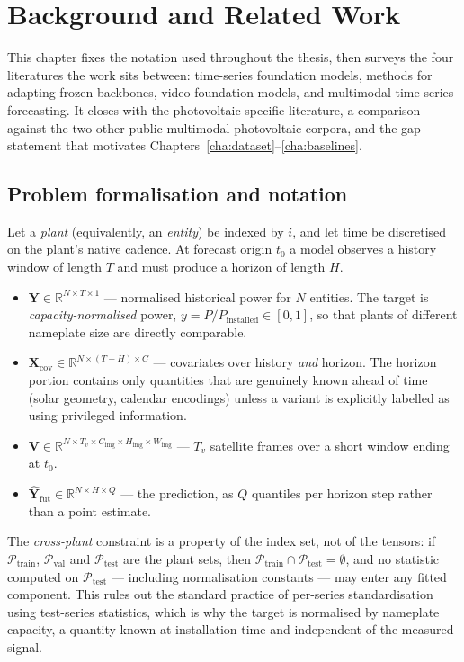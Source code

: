 \chapter{Background and Related Work}
\label{cha:background}

This chapter fixes the notation used throughout the thesis, then surveys the four
literatures the work sits between: time-series foundation models, methods for adapting
frozen backbones, video foundation models, and multimodal time-series forecasting. It
closes with the photovoltaic-specific literature, a comparison against the two other public
multimodal photovoltaic corpora, and the gap statement that motivates
Chapters~\ref{cha:dataset}--\ref{cha:baselines}.

\section{Problem formalisation and notation}
\label{sec:formalisation}

Let a \emph{plant} (equivalently, an \emph{entity}) be indexed by $i$, and let time be
discretised on the plant's native cadence. At forecast origin $t_0$ a model observes a
history window of length $T$ and must produce a horizon of length $H$.

\begin{itemize}
  \item $\mathbf{Y} \in \mathbb{R}^{N \times T \times 1}$ --- normalised historical power
    for $N$ entities. The target is \emph{capacity-normalised} power, $y = P /
    P_{\text{installed}} \in [0,1]$, so that plants of different nameplate size are
    directly comparable.
  \item $\mathbf{X}_{\text{cov}} \in \mathbb{R}^{N \times (T+H) \times C}$ --- covariates
    over history \emph{and} horizon. The horizon portion contains only quantities that are
    genuinely known ahead of time (solar geometry, calendar encodings) unless a variant is
    explicitly labelled as using privileged information.
  \item $\mathbf{V} \in \mathbb{R}^{N \times T_v \times C_{\text{img}} \times H_{\text{img}}
    \times W_{\text{img}}}$ --- $T_v$ satellite frames over a short window ending at $t_0$.
  \item $\hat{\mathbf{Y}}_{\text{fut}} \in \mathbb{R}^{N \times H \times Q}$ --- the
    prediction, as $Q$ quantiles per horizon step rather than a point estimate.
\end{itemize}

The \emph{cross-plant} constraint is a property of the index set, not of the tensors: if
$\mathcal{P}_{\text{train}}$, $\mathcal{P}_{\text{val}}$ and $\mathcal{P}_{\text{test}}$ are
the plant sets, then $\mathcal{P}_{\text{train}} \cap \mathcal{P}_{\text{test}} =
\emptyset$, and no statistic computed on $\mathcal{P}_{\text{test}}$ --- including
normalisation constants --- may enter any fitted component. This rules out the standard
practice of per-series standardisation using test-series statistics, which is why the
target is normalised by nameplate capacity, a quantity known at installation time and
independent of the measured signal.


